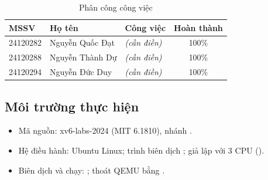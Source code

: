 \begin{table}[H]
\centering
\small
\begin{tabularx}{\textwidth}{l l X c}
\toprule
\textbf{MSSV} & \textbf{Họ tên} & \textbf{Công việc} & \textbf{Hoàn thành} \\
\midrule
24120282 & Nguyễn Quốc Đạt & \textit{(cần điền)} & 100\% \\
24120288 & Nguyễn Thành Dự & \textit{(cần điền)} & 100\% \\
24120294 & Nguyễn Đức Duy  & \textit{(cần điền)} & 100\% \\
\bottomrule
\end{tabularx}
\caption{Phân công công việc}
\end{table}

\subsection{Môi trường thực hiện}

\begin{itemize}
  \item Mã nguồn: xv6-labs-2024 (MIT 6.1810), nhánh .
  \item Hệ điều hành: Ubuntu Linux; trình biên dịch ;
        giả lập  với 3 CPU ().
  \item Biên dịch và chạy: ; thoát QEMU bằng .
\end{itemize}
